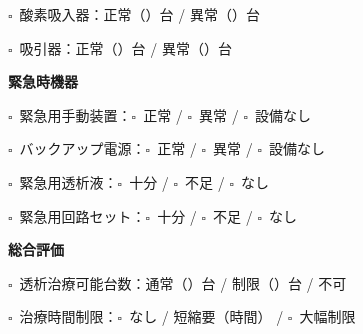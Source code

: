 \documentclass[a4paper,12pt]{jarticle}
\newcommand{\checkbox}{$\square$\ }
\newcommand{\underlinespace}[1]{\underline{\hspace{#1}}}
\begin{document}
\vspace{2mm}

\noindent
\checkbox 酸素吸入器：\quad 正常（\underlinespace{1.5cm}）台 \quad / \quad 異常（\underlinespace{1.5cm}）台

\vspace{2mm}

\noindent
\checkbox 吸引器：\quad 正常（\underlinespace{1.5cm}）台 \quad / \quad 異常（\underlinespace{1.5cm}）台

\vspace{8mm}

\begin{center}
\textbf{\large 緊急時機器}
\end{center}

\vspace{3mm}

\noindent
\checkbox 緊急用手動装置：\quad \checkbox 正常 \quad / \quad \checkbox 異常 \quad / \quad \checkbox 設備なし

\vspace{2mm}

\noindent
\checkbox バックアップ電源：\quad \checkbox 正常 \quad / \quad \checkbox 異常 \quad / \quad \checkbox 設備なし

\vspace{2mm}

\noindent
\checkbox 緊急用透析液：\quad \checkbox 十分 \quad / \quad \checkbox 不足 \quad / \quad \checkbox なし

\vspace{2mm}

\noindent
\checkbox 緊急用回路セット：\quad \checkbox 十分 \quad / \quad \checkbox 不足 \quad / \quad \checkbox なし

\vspace{8mm}

\begin{center}
\textbf{\large 総合評価}
\end{center}

\vspace{3mm}

\noindent
\checkbox 透析治療可能台数：\quad 通常（\underlinespace{2cm}）台 \quad / \quad 制限（\underlinespace{2cm}）台 \quad / \quad 不可

\vspace{2mm}

\noindent
\checkbox 治療時間制限：\quad \checkbox なし \quad / \quad 短縮要（\underlinespace{2cm}時間） \quad / \quad \checkbox 大幅制限
\end{document}
